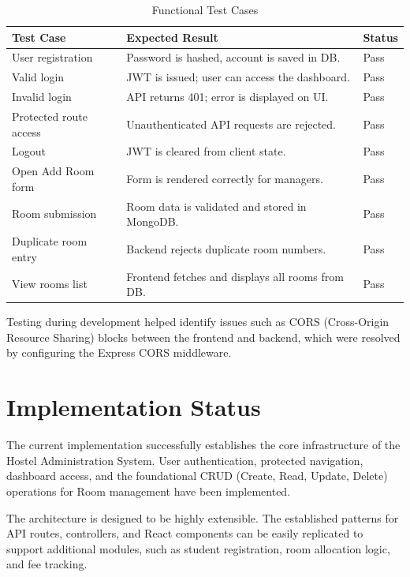 \begin{table}[H]
\centering
\caption{Functional Test Cases}
\label{tab:testcases}
\begin{tabular}{p{} p{} p{}}
\toprule
\textbf{Test Case} & \textbf{Expected Result} & \textbf{Status} \\
\midrule
User registration & Password is hashed, account is saved in DB. & Pass \\
Valid login & JWT is issued; user can access the dashboard. & Pass \\
Invalid login & API returns 401; error is displayed on UI. & Pass \\
Protected route access & Unauthenticated API requests are rejected. & Pass \\
Logout & JWT is cleared from client state. & Pass \\
Open Add Room form & Form is rendered correctly for managers. & Pass \\
Room submission & Room data is validated and stored in MongoDB. & Pass \\
Duplicate room entry & Backend rejects duplicate room numbers. & Pass \\
View rooms list & Frontend fetches and displays all rooms from DB. & Pass \\
\bottomrule
\end{tabular}
\end{table}

Testing during development helped identify issues such as CORS (Cross-Origin Resource Sharing) blocks between the frontend and backend, which were resolved by configuring the Express CORS middleware.

\section{Implementation Status}

The current implementation successfully establishes the core infrastructure of the Hostel Administration System. User authentication, protected navigation, dashboard access, and the foundational CRUD (Create, Read, Update, Delete) operations for Room management have been implemented.

The architecture is designed to be highly extensible. The established patterns for API routes, controllers, and React components can be easily replicated to support additional modules, such as student registration, room allocation logic, and fee tracking.

